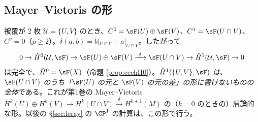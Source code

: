 \subsection{Mayer--Vietoris の形}
被覆が 2 枚 $\mathcal U=\{U,V\}$ のとき、$C^0=\sF(U)\oplus\sF(V)$、$C^1=\sF(U\cap V)$、$C^p=0$（$p\ge2$）。$\delta(a,b)=b|_{U\cap V}-a|_{U\cap V}$。したがって
\[
0\to\check H^0(\mathcal U,\sF)\to\sF(U)\oplus\sF(V)\xrightarrow{\ \delta\ }\sF(U\cap V)\to\check H^1(\mathcal U,\sF)\to0
\]
は完全で、$\check H^0=\sF(X)$（命題 \ref{prop:cechH0}）。\emph{$\check H^1(\{U,V\},\sF)$ は、$\sF(U\cap V)$ のうち「$\sF(U)$ の元と $\sF(V)$ の元の差」の形に書けないものの全体}である。これが第1巻の Mayer--Vietoris $H^k(U)\oplus H^k(V)\to H^k(U\cap V)\xrightarrow{\delta}H^{k+1}(M)$ の（$k=0$ のときの）層論的な形。以後の \S\ref{sec:leray} の $\CP^1$ の計算は、この形で行う。

